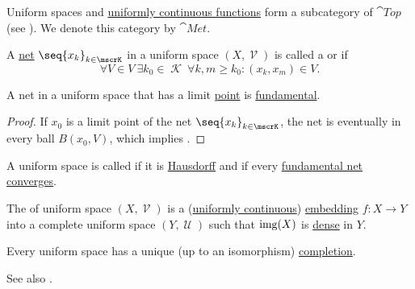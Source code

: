 \begin{definition}\label{def:category_of_uniform_spaces}
  Uniform spaces and \hyperref[def:uniform_continuity]{uniformly continuous functions} form a subcategory of \( \cat{Top} \) (see ). We denote this category by \( \cat{Met} \).
\end{definition}

\begin{definition}\label{def:fundamental_net}
  A \hyperref[def:topological_net]{net} \( \seq{ x_k }_{k \in \mscrK} \) in a uniform space \( (X, \mscrV) \) is called a  or  if
  \begin{equation*}
    \forall V \in V \ \exists k_0 \in \mscrK \ \forall k, m \geq k_0 : (x_k, x_m) \in V.
  \end{equation*}
\end{definition}

\begin{lemma}\label{thm:convergent_net_is_fundamental}
  A net in a uniform space that has a limit \hyperref[def:net_convergence/limit]{point} is \hyperref[def:fundamental_net]{fundamental}.
\end{lemma}
\begin{proof}
  If \( x_0 \) is a limit point of the net \( \seq{ x_k }_{k \in \mscrK} \), the net is eventually in every ball \( B(x_0, V) \), which implies .
\end{proof}

\begin{definition}\label{def:complete_uniform_space}
  A uniform space is called  if it is \hyperref[def:separation_axioms/T2]{Hausdorff} and if every \hyperref[def:fundamental_net]{fundamental net} \hyperref[def:net_convergence/limit]{converges}.

  The  of uniform space \( (X, \mscrV) \) is a (\hyperref[def:uniform_continuity]{uniformly continuous}) \hyperref[def:morphism_invertibility/left_cancellative]{embedding} \( f: X \to Y \) into a complete uniform space \( (Y, \mscrU) \) such that \( \operatorname{img}(X) \) is \hyperref[def:topologically_dense_set]{dense} in \( Y \).
\end{definition}

\begin{theorem}\label{thm:uniform_space_completion}
  Every uniform space has a unique (up to an isomorphism) \hyperref[def:complete_uniform_space]{completion}.

  See also .
\end{theorem}


